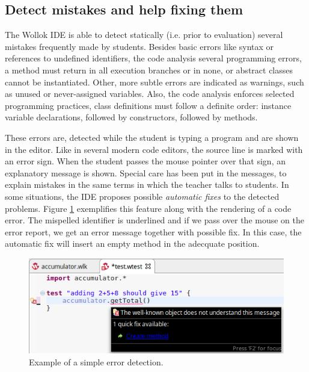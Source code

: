 \subsection{Detect mistakes and help fixing them}
\label{sec:detectMistakes}
The Wollok IDE is able to detect statically (i.e. prior to evaluation) several mistakes frequently made by students. 
Besides basic errors like syntax or references to undefined identifiers, the code analysis several programming errors, 
\eg a method must return in all execution branches or in none,
or abstract classes cannot be instantiated.
Other, more subtle errors are indicated as warnings,
such as unused or never-assigned variables.
Also, the code analysis enforces selected programming practices, 
\eg class definitions must follow a definite order: instance variable declarations, followed by constructors, followed by methods. 

These errors are, detected while the student is typing a program and are shown in the editor. 
Like in several modern code editors, the source line is marked with an error sign. 
When the student passes the mouse pointer over that sign, an explanatory message is shown.
Special care has been put in the messages, to explain mistakes in the same terms in which the teacher talks to students.
In some situations, the IDE proposes possible \emph{automatic fixes} to the detected problems.
Figure \ref{fig:errorReporting} exemplifies this feature along with the rendering of a code error. 
The mispelled identifier is underlined and if we pass over the mouse on the error report, we get an error message together with possible fix.
In this case, the automatic fix will insert an empty method in the adecquate position. 

\begin{figure}[ht]
\vspace{-2mm}
\centering
\includegraphics[scale=0.5, trim={0 0 0.15cm 0},clip]{images/errorReporting.png}
\vspace{-5mm}
\caption{\small Example of a simple error detection.}
\label{fig:errorReporting}
\vspace{-3mm}
\end{figure}

